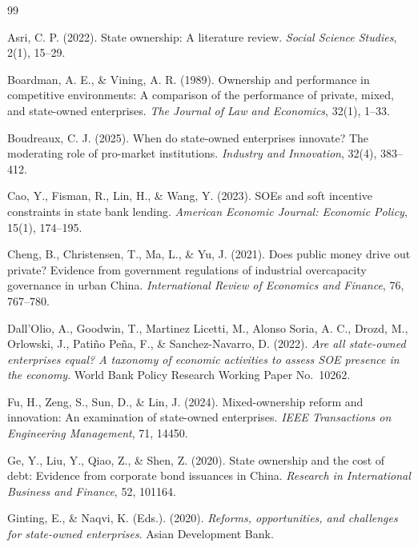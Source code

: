 \documentclass[11pt,a4paper]{ctexart}
\begin{document}
\begin{thebibliography}{99}
\setlength{\itemsep}{0pt}

 Asri, C. P. (2022). State ownership: A literature review. \emph{Social Science Studies}, 2(1), 15--29.

 Boardman, A. E., \& Vining, A. R. (1989). Ownership and performance in competitive environments: A comparison of the performance of private, mixed, and state-owned enterprises. \emph{The Journal of Law and Economics}, 32(1), 1--33.

 Boudreaux, C. J. (2025). When do state-owned enterprises innovate? The moderating role of pro-market institutions. \emph{Industry and Innovation}, 32(4), 383--412.

 Cao, Y., Fisman, R., Lin, H., \& Wang, Y. (2023). SOEs and soft incentive constraints in state bank lending. \emph{American Economic Journal: Economic Policy}, 15(1), 174--195.

 Cheng, B., Christensen, T., Ma, L., \& Yu, J. (2021). Does public money drive out private? Evidence from government regulations of industrial overcapacity governance in urban China. \emph{International Review of Economics and Finance}, 76, 767--780.

 Dall'Olio, A., Goodwin, T., Martinez Licetti, M., Alonso Soria, A. C., Drozd, M., Orlowski, J., Patiño Peña, F., \& Sanchez-Navarro, D. (2022). \emph{Are all state-owned enterprises equal? A taxonomy of economic activities to assess SOE presence in the economy}. World Bank Policy Research Working Paper No.~10262.

 Fu, H., Zeng, S., Sun, D., \& Lin, J. (2024). Mixed-ownership reform and innovation: An examination of state-owned enterprises. \emph{IEEE Transactions on Engineering Management}, 71, 14450.

 Ge, Y., Liu, Y., Qiao, Z., \& Shen, Z. (2020). State ownership and the cost of debt: Evidence from corporate bond issuances in China. \emph{Research in International Business and Finance}, 52, 101164.

 Ginting, E., \& Naqvi, K. (Eds.). (2020). \emph{Reforms, opportunities, and challenges for state-owned enterprises}. Asian Development Bank.


\end{thebibliography}
\end{document}
